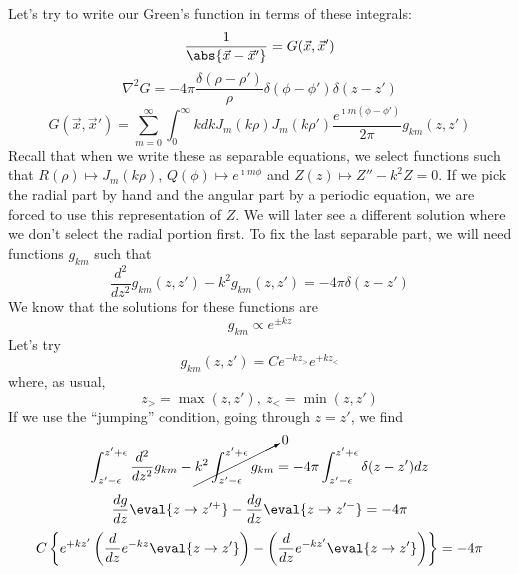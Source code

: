 \documentclass[a4paper,twoside,master.tex]{subfiles}
\begin{document}
Let's try to write our Green's function in terms of these integrals:
\begin{equation}
    \frac{1}{\abs{\vec{x}-\vec{x}'}} = G(\vec{x},\vec{x}')
\end{equation}
\begin{equation}
    \nabla^2 G = -4\pi \frac{\delta(\rho-\rho')}{\rho}\delta(\phi-\phi')\delta(z-z')
\end{equation}
\begin{equation}
    G(\vec{x},\vec{x}') = \sum_{m=0}^{\infty} \int_{0}^{\infty}kdk J_m(k\rho)J_m(k\rho') \frac{e^{\imath m(\phi-\phi')}}{2\pi}g_{km}(z,z')
\end{equation}
Recall that when we write these as separable equations, we select functions such that $R(\rho)\mapsto J_m(k\rho)$, $Q(\phi)\mapsto e^{\imath m\phi}$ and $Z(z)\mapsto Z''-k^2Z = 0$. If we pick the radial part by hand and the angular part by a periodic equation, we are forced to use this representation of $Z$. We will later see a different solution where we don't select the radial portion first. To fix the last separable part, we will need functions $g_{km}$ such that
\begin{equation}
    \frac{d^2}{dz^2}g_{km}(z,z') - k^2 g_{km}(z,z') = -4\pi\delta(z-z')
\end{equation}
We know that the solutions for these functions are
\begin{equation}
    g_{km} \propto e^{\pm kz}
\end{equation}
Let's try
\begin{equation}
    g_{km}(z,z') = C e^{-kz_>} e^{+kz_<}
\end{equation}
where, as usual,
\begin{equation}
    z_> = \max(z,z'),\ z_< = \min(z,z')
\end{equation}
If we use the ``jumping'' condition, going through $z=z'$, we find
\begin{equation}
    \int_{z'-\epsilon}^{z'+\epsilon}\frac{d^2}{dz^2}g_{km} - \cancelto{0}{k^2\int_{z'-\epsilon}^{z'+\epsilon} g_{km}} = -4\pi\int_{z'-\epsilon}^{z'+\epsilon} \delta(z-z')dz
\end{equation}
\begin{equation}
    \frac{dg}{dz}\eval{z\to z'^+} - \frac{dg}{dz}\eval{z\to z'^-} = -4\pi
\end{equation}
\begin{equation}
    C \left\{ e^{+kz'}\left( \frac{d}{dz}e^{-kz}\eval{z\to z'} \right) - \left( \frac{d}{dz}e^{-kz'}\eval{z\to z'} \right)   \right\} = -4\pi
\end{equation}
\end{document}
